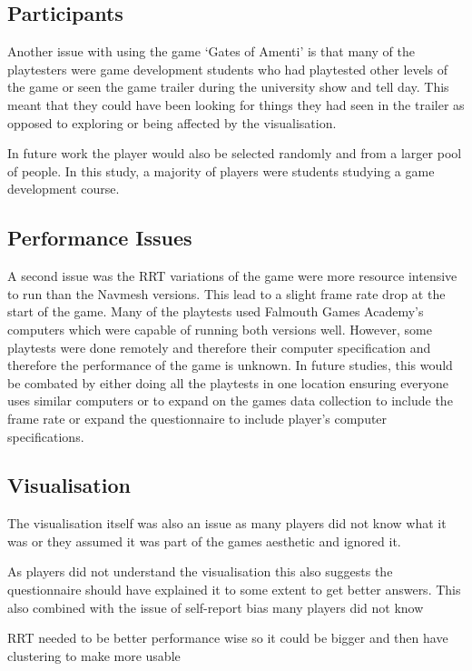 \documentclass[journal]{IEEEtran}
\begin{document}
	\subsection{Participants}
	Another issue with using the game `Gates of Amenti' is that many of the playtesters were game development students who had playtested other levels of the game or seen the game trailer during the university show and tell day. This meant that they could have been looking for things they had seen in the trailer as opposed to exploring or being affected by the visualisation.
	
	In future work the player would also be selected randomly and from a larger pool of people. In this study, a majority of players were students studying a game development course.
	
	\subsection{Performance Issues}
	A second issue was the RRT variations of the game were more resource intensive to run than the Navmesh versions. This lead to a slight frame rate drop at the start of the game. 
	Many of the playtests used Falmouth Games Academy's computers which were capable of running both versions well. However, some playtests were done remotely and therefore their computer specification and therefore the performance of the game is unknown. In future studies, this would be combated by either doing all the playtests in one location ensuring everyone uses similar computers or to expand on the games data collection to include the frame rate or expand the questionnaire to include player's computer specifications.     
	
	\subsection{Visualisation}    
	The visualisation itself was also an issue as many players did not know what it was or they assumed it was part of the games aesthetic and ignored it.    
	
	As players did not understand the visualisation this also suggests the questionnaire should have explained it to some extent to get better answers. This also combined with the issue of self-report bias many players did not know  
	
	RRT needed to be better performance wise so it could be bigger and then have clustering to make more usable 
	
\end{document}

